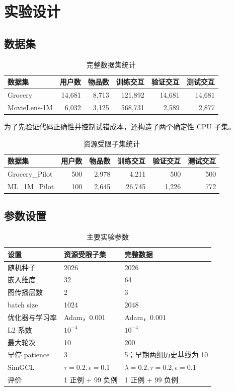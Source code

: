 \documentclass[UTF8,a4paper,12pt]{ctexart}
\begin{document}
\section{实验设计}

\subsection{数据集}

\begin{table}[H]
  \centering
  \caption{完整数据集统计}
  \label{tab:full-data}
  \begin{tabular}{lrrrrr}
    \toprule
    数据集 & 用户数 & 物品数 & 训练交互 & 验证交互 & 测试交互\\
    \midrule
    Grocery & 14,681 & 8,713 & 121,892 & 14,681 & 14,681\\
    MovieLens-1M & 6,032 & 3,125 & 568,731 & 2,589 & 2,877\\
    \bottomrule
  \end{tabular}
\end{table}

为了先验证代码正确性并控制试错成本，还构造了两个确定性 CPU 子集。

\begin{table}[H]
  \centering
  \caption{资源受限子集统计}
  \label{tab:pilot-data}
  \begin{tabular}{lrrrrr}
    \toprule
    数据集 & 用户数 & 物品数 & 训练交互 & 验证交互 & 测试交互\\
    \midrule
    Grocery\_Pilot & 500 & 2,978 & 4,211 & 500 & 500\\
    ML\_1M\_Pilot & 100 & 2,645 & 26,745 & 1,226 & 772\\
    \bottomrule
  \end{tabular}
\end{table}

\subsection{参数设置}

\begin{table}[H]
  \centering
  \caption{主要实验参数}
  \label{tab:settings}
  \begin{tabularx}{\textwidth}{lXX}
    \toprule
    设置 & 资源受限子集 & 完整数据\\
    \midrule
    随机种子 & 2026 & 2026\\
    嵌入维度 & 32 & 64\\
    图传播层数 & 2 & 3\\
    batch size & 1024 & 2048\\
    优化器与学习率 & Adam，0.001 & Adam，0.001\\
    L2 系数 & $10^{-4}$ & $10^{-4}$\\
    最大轮次 & 10 & 200\\
    早停 patience & 3 & 5；早期两组历史基线为 10\\
    SimGCL & $\tau=0.2,\epsilon=0.1$ & $\lambda=0.2,\tau=0.2,\epsilon=0.1$\\
    评价 & 1 正例 + 99 负例 & 1 正例 + 99 负例\\
    \bottomrule
  \end{tabularx}
\end{table}
\end{document}
